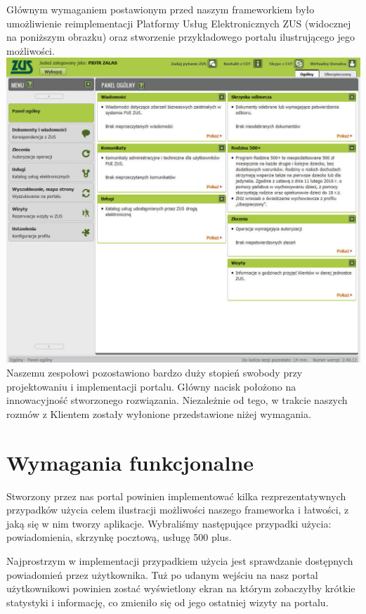 \documentclass[licencjacka]{pracamgr}
\begin{document}
Głównym wymaganiem postawionym przed naszym frameworkiem było umożliwienie reimplementacji
Platformy Usług Elektronicznych ZUS \cite{zuspue} (widocznej na poniższym obrazku) oraz stworzenie
przykładowego portalu ilustrującego jego możliwości.\\
\includegraphics[width=\textwidth]{obrazki/pue2.png}
Naszemu zespołowi pozostawiono bardzo duży stopień swobody przy projektowaniu i
implementacji portalu. Główny nacisk położono na innowacyjność stworzonego rozwiązania.
Niezależnie od tego, w trakcie naszych rozmów z Klientem zostały wyłonione przedstawione
niżej wymagania.

\section{Wymagania funkcjonalne}

Stworzony przez nas portal powinien implementować kilka rezprezentatywnych
przypadków użycia celem ilustracji możliwości naszego frameworka i łatwości,
z jaką się w nim tworzy aplikacje. Wybraliśmy następujące przypadki użycia:
powiadomienia, skrzynkę pocztową, usługę 500 plus.

Najprostrzym w implementacji przypadkiem użycia jest sprawdzanie dostępnych
powiadomień przez użytkownika. Tuż po udanym wejściu na nasz portal użytkownikowi
powinien zostać wyświetlony ekran na którym zobaczyłby krótkie statystyki i
informację, co zmieniło się od jego ostatniej wizyty na portalu.
\end{document}
